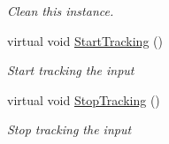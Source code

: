 \begin{DoxyCompactItemize}
\begin{DoxyCompactList}\small\item\em Clean this instance. \end{DoxyCompactList}\item 
virtual void \hyperlink{class_scaffolding_1_1_input_tracker_a354f0c69074700a14d7d969d9e6b18e4}{Start\+Tracking} ()
\begin{DoxyCompactList}\small\item\em Start tracking the input \end{DoxyCompactList}\item 
virtual void \hyperlink{class_scaffolding_1_1_input_tracker_a2381c906d5c7c84cb8fad33ad95c7386}{Stop\+Tracking} ()
\begin{DoxyCompactList}\small\item\em Stop tracking the input \end{DoxyCompactList}\end{DoxyCompactItemize}

